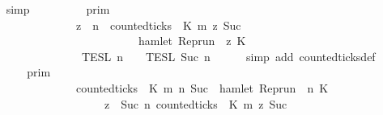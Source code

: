 \begin{isabellebody}
\ \ \ \ \isamarkupfalse%
\ simp\isanewline
\ \ \isamarkupfalse%
\ \isamarkupfalse%
\ {\isacartoucheopen}{\isachardot}{\isachardot}{\isachardot}\ {\isacharequal}\ {\isasymlbrakk}{\isasymlbrakk}\ {\isasymGamma}\ {\isasymrbrakk}{\isasymrbrakk}\isactrlsub p\isactrlsub r\isactrlsub i\isactrlsub m\ \isanewline
\ \ \ \ \ \ \ \ \ \ \ \ \ \ \ \ {\isasyminter}\ {\isacharbraceleft}{\isasymrho}{\isachardot}\ {\isasymforall}z\ {\isasymge}\ n{\isachardot}\ \ {\isacharparenleft}counted{\isacharunderscore}ticks\ {\isasymrho}\ K\ m\ z\ {\isacharparenleft}Suc\ {}{\isacharparenright}{\isacharparenright}\isanewline
\ \ \ \ \ \ \ \ \ \ \ \ \ \ \ \ \ \ \ \ \ \ \ \ \ \ \ \ {\isasymlongrightarrow}\ hamlet\ {\isacharparenleft}{\isacharparenleft}Rep{\isacharunderscore}run\ {\isasymrho}{\isacharparenright}\ z\ K\ {\isacharbraceright}\isanewline
\ \ \ \ \ \ \ \ \ \ \ \ \ \ \ \ {\isasyminter}\ {\isasymlbrakk}{\isasymlbrakk}\ {\isasymPsi}\ {\isasymrbrakk}{\isasymrbrakk}\isactrlsub T\isactrlsub E\isactrlsub S\isactrlsub L\isactrlbsup {\isasymge}\ n\isactrlesup \ {\isasyminter}\ {\isasymlbrakk}{\isasymlbrakk}\ {\isasymPhi}\ {\isasymrbrakk}{\isasymrbrakk}\isactrlsub T\isactrlsub E\isactrlsub S\isactrlsub L\isactrlbsup {\isasymge}\ Suc\ n\isactrlesup {\isacartoucheclose}\isanewline
\ \ \ \ \isamarkupfalse%
\ {\isacharparenleft}simp\ add{\isacharcolon}\ counted{\isacharunderscore}ticks{\isacharunderscore}def{\isacharparenright}\isanewline
\ \ \isamarkupfalse%
\ \isamarkupfalse%
\ {\isacartoucheopen}{\isachardot}{\isachardot}{\isachardot}\ {\isacharequal}\ {\isasymlbrakk}{\isasymlbrakk}\ {\isasymGamma}\ {\isasymrbrakk}{\isasymrbrakk}\isactrlsub p\isactrlsub r\isactrlsub i\isactrlsub m\ \isanewline
\ \ \ \ \ \ \ \ \ \ \ \ \ \ \ \ {\isasyminter}\ {\isacharbraceleft}{\isasymrho}{\isachardot}\ {\isacharparenleft}counted{\isacharunderscore}ticks\ {\isasymrho}\ K\ m\ n\ {\isacharparenleft}Suc\ {}{\isacharparenright}{\isasymlongrightarrow}\ hamlet\ {\isacharparenleft}{\isacharparenleft}Rep{\isacharunderscore}run\ {\isasymrho}{\isacharparenright}\ n\ K\isanewline
\ \ \ \ \ \ \ \ \ \ \ \ \ \ \ \ \ \ \ \ \ \ {\isasymand}\ {\isacharparenleft}{\isasymforall}z\ {\isasymge}\ Suc\ n{\isachardot}\ {\isacharparenleft}counted{\isacharunderscore}ticks\ {\isasymrho}\ K\ m\ z\ {\isacharparenleft}Suc\ {}{\isacharparenright}{\isacharparenright}\isanewline

\end{isabellebody}
